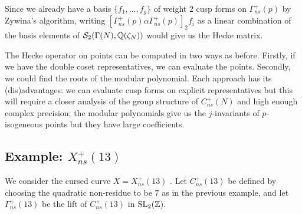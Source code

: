 Since we already have a basis $\{f_1, \ldots, f_g \}$ of weight $2$ cusp forms on $\Gamma_{ns}^+(p)$ by Zywina's algorithm, writing $[\Gamma_{ns}^+(p)\alpha\Gamma_{ns}^+(p)]_2 f_i $ as a linear combination of the basis elements of $\mathcal{S}_2(\Gamma(N), \mathbb{Q}(\zeta_N))$ would give us the Hecke matrix.

The Hecke operator on points can be computed in two ways as before. Firstly, if we have the double coset representatives, we can evaluate the points. Secondly, we could find the roots of the modular polynomial. Each approach has its (dis)advantages: we can evaluate cusp forms on explicit representatives but this will require a closer analysis of the group structure of $C_{ns}^+(N)$ and high enough complex precision; the modular polynomials give us the $j$-invariants of $p$-isogeneous points but they have large coefficients.

\subsection{Example: $X_{ns}^+(13)$}

We consider the cursed curve $X = X_{ns}^+(13)$ \cite{cursed-curve}. Let $C_{ns}^+(13)$ be defined by choosing the quadratic non-residue to be $7$ as in the previous example, and let $\Gamma_{ns}^+(13)$ be the lift of $C_{ns}^+(13)$ in $\operatorname{SL}_2(\mathbb{Z})$.

